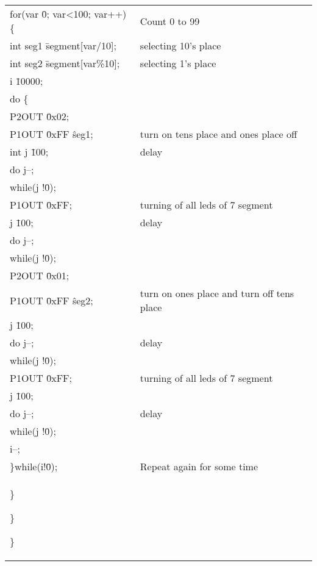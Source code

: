 \documentclass[12pt, letterpaper]{article}
\newcommand\tab[1][1cm]{\hspace*{#1}}
\begin{document}
\begin{longtable}{|p{6cm}||p{5cm}|}
      \tab\tab  for(var \= 0; var<100; var++) \{ & Count 0 to 99\\
        \tab\tab\tab    int seg1 \= segment[var/10]; & selecting 10's place\\ 
        \tab\tab\tab    int seg2 \= segment[var\%10]; & selecting 1's place \\
         \tab\tab\tab   i \= 10000; & \\
         \tab\tab\tab   do \{ & \\
            \tab\tab\tab    P2OUT \= 0x02; & \\
            \tab\tab\tab    P1OUT \= 0xFF \^ seg1; & turn on tens place and ones place off\\
            \tab\tab\tab    int j \= 100; &  delay \\
            \tab\tab\tab    do j--; & \\
            \tab\tab\tab    while(j !\= 0); & \\
            \tab\tab\tab    P1OUT \= 0xFF;    & turning of all leds of 7 segment \\
            \tab\tab\tab     j \= 100; & delay\\
            \tab\tab\tab    do j--; & \\
            \tab\tab\tab    while(j !\= 0); & \\
            \tab\tab\tab    P2OUT \= 0x01; & \\
            \tab\tab\tab    P1OUT \= 0xFF \^ seg2;     &  turn on ones place and turn off tens place\\
            \tab\tab\tab    j \= 100; & \\
            \tab\tab\tab    do j--; &  delay\\
            \tab\tab\tab    while(j !\= 0); & \\

            \tab\tab\tab    P1OUT \= 0xFF; & turning of all leds of 7 segment\\
            \tab\tab\tab    j \= 100; & \\
            \tab\tab\tab    do j--; & delay\\
            \tab\tab\tab    while(j !\= 0); & \\


             \tab\tab\tab   i--; & \\
          \tab\tab\tab  \}while(i!\=0); &  Repeat again for some time\\
       \tab\tab \}

  \tab \}
   
\}



\end{longtable}
\end{document}
